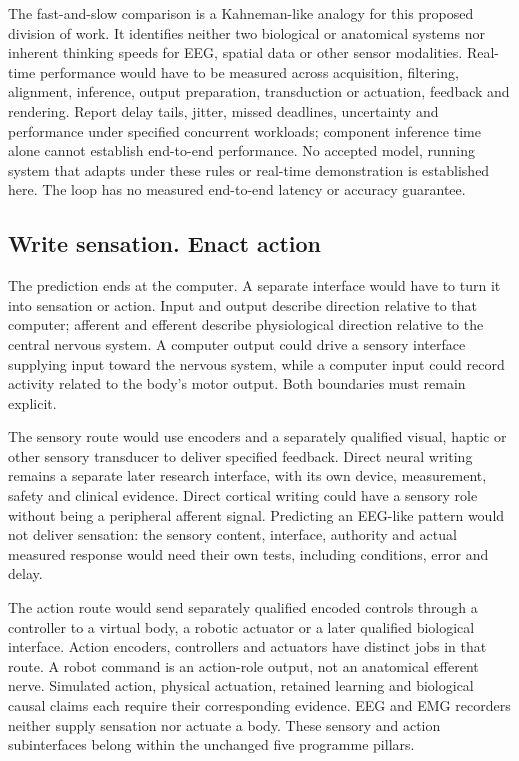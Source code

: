 The fast-and-slow comparison is a Kahneman-like analogy for this proposed
division of work. It identifies neither two biological or anatomical systems
nor inherent thinking speeds for EEG, spatial data or other sensor modalities.
Real-time performance would have to be measured across acquisition, filtering,
alignment, inference, output preparation, transduction or actuation, feedback
and rendering. Report delay tails, jitter, missed deadlines, uncertainty and
performance under specified concurrent workloads; component inference time alone cannot
establish end-to-end performance. No accepted model, running system that adapts
under these rules or real-time demonstration is established here. The loop has
no measured end-to-end latency or accuracy guarantee.

\subsection{Write sensation. Enact action}
\label{b2-output-interfaces}
The prediction ends at the computer. A separate interface would have to turn
it into sensation or action. Input and output describe direction relative to
that computer; afferent and efferent describe physiological direction relative
to the central nervous system. A computer output could drive a sensory
interface supplying input toward the nervous system, while a computer input
could record activity related to the body's motor output. Both boundaries
must remain explicit.

The sensory route would use encoders and a separately qualified visual, haptic
or other sensory transducer to deliver specified feedback. Direct neural
writing remains a separate later research interface, with its own device,
measurement, safety and clinical evidence. Direct cortical writing could have
a sensory role without being a peripheral afferent signal. Predicting an
EEG-like pattern would not deliver sensation: the sensory content, interface,
authority and actual measured response would need their own tests, including
conditions, error and delay.

The action route would send separately qualified encoded controls through a
controller to a virtual body, a robotic actuator or a later qualified biological
interface. Action encoders, controllers and actuators have distinct jobs in
that route. A robot command is an action-role output, not an anatomical efferent
nerve. Simulated action, physical actuation, retained learning and biological
causal claims each require their corresponding evidence. EEG and EMG recorders
neither supply sensation nor actuate a body. These sensory and action
subinterfaces belong within the unchanged five programme pillars.

